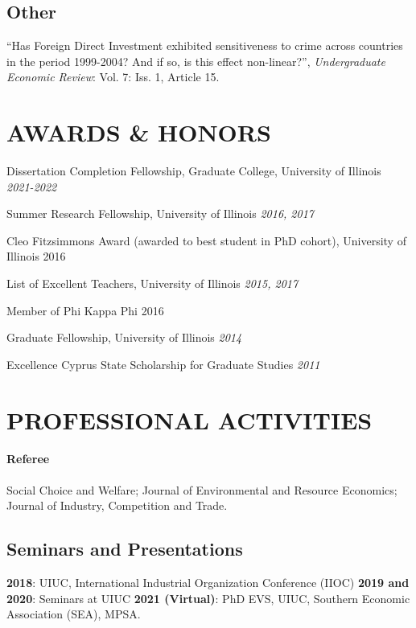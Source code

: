 \documentclass{article}
\begin{document}
\subsection{Other}
``Has Foreign Direct Investment exhibited sensitiveness to crime across countries in the period 1999-2004? And if so, is this effect non-linear?'', \emph{Undergraduate Economic Review}: Vol. 7: Iss. 1, Article 15. %


\section{AWARDS \& HONORS}

Dissertation Completion Fellowship, Graduate College, University of Illinois \hfill \emph{2021-2022}

Summer Research Fellowship, University of Illinois \hfill \emph{2016, 2017}

Cleo Fitzsimmons Award (awarded to best student in PhD cohort), University of Illinois \hfill 2016

List of Excellent Teachers, University of Illinois \hfill \emph{2015, 2017}

Member of Phi Kappa Phi \hfill {2016}

Graduate Fellowship, University of Illinois \hfill \emph{2014}

Excellence Cyprus State Scholarship for Graduate Studies \hfill \emph{2011}


\section{PROFESSIONAL ACTIVITIES}
\paragraph{Referee} Social Choice and Welfare; Journal of Environmental and Resource Economics; Journal of Industry, Competition and Trade.
\subsection{Seminars and Presentations}
{\bf 2018}: UIUC, International Industrial Organization Conference (IIOC) {\bf 2019 and 2020}: Seminars at UIUC {\bf 2021 (Virtual)}: PhD EVS, UIUC, Southern Economic Association (SEA), MPSA.
\end{document}
